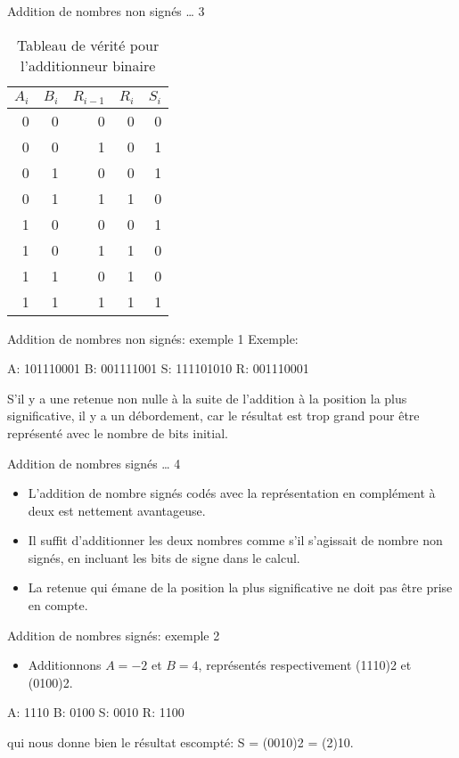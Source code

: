 \documentclass[presentation]{beamer}
\begin{document}
\begin{frame}[label={sec:orgf3a6126}]{Addition de nombres non signés \ldots{} 3}
\begin{table}[htbp]
\caption{\label{tab:orgb7f07f3}Tableau de vérité pour l'additionneur binaire}
\centering
\begin{tabular}{rrrrr}
\(A_{i}\) & \(B_{i}\) & \(R_{i-1}\) & \(R_{i}\) & \(S_{i}\)\\
\hline
0 & 0 & 0 & 0 & 0\\
0 & 0 & 1 & 0 & 1\\
0 & 1 & 0 & 0 & 1\\
0 & 1 & 1 & 1 & 0\\
1 & 0 & 0 & 0 & 1\\
1 & 0 & 1 & 1 & 0\\
1 & 1 & 0 & 1 & 0\\
1 & 1 & 1 & 1 & 1\\
\end{tabular}
\end{table}
\end{frame}

\begin{frame}[label={sec:org164d2b3}]{Addition de nombres non signés: exemple 1}
Exemple:

A: 101110001
B: 001111001
S: 111101010
R: 001110001

S'il y a une retenue non nulle à la suite de l'addition à la position la plus significative, il y a un \alert{débordement}, car le résultat est trop grand pour être représenté avec le nombre de bits initial.
\end{frame}

\begin{frame}[label={sec:org3ae36c6}]{Addition de nombres signés \ldots{} 4}
\begin{itemize}
\item L'addition de nombre signés codés avec la représentation en complément à deux est nettement avantageuse.

\item Il suffit d’additionner les deux nombres comme s'il s'agissait de nombre non signés, en incluant les bits de signe dans le calcul.

\item La retenue qui émane de la position la plus significative ne doit pas être prise en compte.
\end{itemize}
\end{frame}

\begin{frame}[label={sec:orgcd7dbbe}]{Addition de nombres signés: exemple 2}
\begin{itemize}
\item Additionnons \(A=-2\) et \(B=4\), représentés respectivement (1110)2 et (0100)2.
\end{itemize}

A: 1110
B: 0100
S: 0010
R: 1100

qui nous donne bien le résultat escompté: S = (0010)2 = (2)10.
\end{frame}
\end{document}
